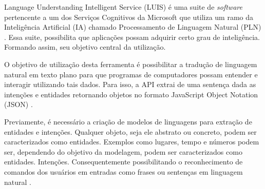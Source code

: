 Language Understanding Intelligent Service (LUIS) é uma suite de \textit{software} pertencente a um dos Serviços Cognitivos da Microsoft que utiliza um ramo da Inteligência Artificial (IA) chamado Processamento de Linguagem Natural (PLN) \cite{Mayo:2017}. Essa suite, possibilita que aplicações possam adquirir certo grau de inteligência. Formando assim, seu objetivo central da utilização.

O objetivo de utilização desta ferramenta é possibilitar a tradução de linguagem natural em texto plano para que programas de computadores possam entender e interagir utilizando tais dados. Para isso, a API extrai de uma sentença dada as intenções e entidades retornando objetos no formato JavaScript Object Notation (JSON) \cite{Mayo:2017}.

Previamente, é necessário a criação de modelos de linguagens para extração de entidades e intenções. Qualquer objeto, seja ele abstrato ou concreto, podem ser caracterizados como entidades. Exemplos como lugares, tempo e números podem ser, dependendo do objetivo da modelagem, podem ser caracterizados como entidades. Intenções.  Consequentemente possibilitando o reconhecimento de comandos dos usuários em entradas como frases ou sentenças em linguagem natural \cite{Larsen:2017}.
